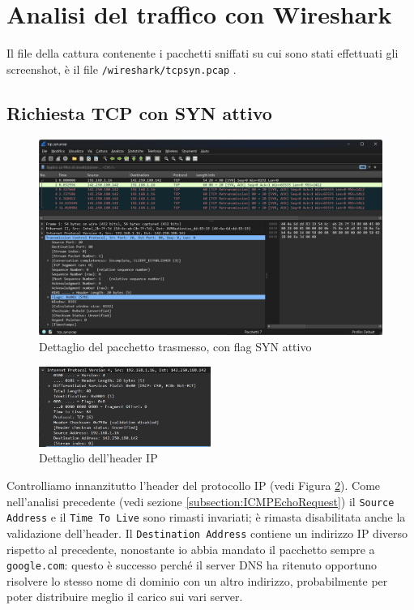 \documentclass[12pt,a4paper]{report}
\begin{document}
\section{Analisi del traffico con Wireshark}
Il file della cattura contenente i pacchetti sniffati su cui sono stati effettuati gli screenshot, è il file \texttt{/wireshark/tcp{\textunderscore}syn.pcap} .

\subsection{Richiesta TCP con SYN attivo}
\begin{figure}[H]
	\centering
	\includegraphics[width=1\textwidth]{tcp_syn_request}
 	\caption{Dettaglio del pacchetto trasmesso, con flag SYN attivo}
	\label{tcp_syn_request}
\end{figure}
\begin{figure}[H]
	\centering
	\includegraphics[width=0.5\textwidth]{tcp_syn_request_ip_layer}
 	\caption{Dettaglio dell'header IP}
	\label{tcp_syn_request_ip_layer}
\end{figure}
Controlliamo innanzitutto l'header del protocollo IP (vedi Figura \ref{tcp_syn_request_ip_layer}).
Come nell'analisi precedente (vedi sezione \ref{subsection:ICMPEchoRequest}) il \texttt{Source Address} e il \texttt{Time To Live} sono rimasti invariati; è rimasta disabilitata anche la validazione dell'header.
Il \texttt{Destination Address} contiene un indirizzo IP diverso rispetto al precedente, nonostante io abbia mandato il pacchetto sempre a \texttt{google.com}: questo è successo perché il server DNS ha ritenuto opportuno risolvere lo stesso nome di dominio con un altro indirizzo, probabilmente per poter distribuire meglio il carico sui vari server.
\end{document}
